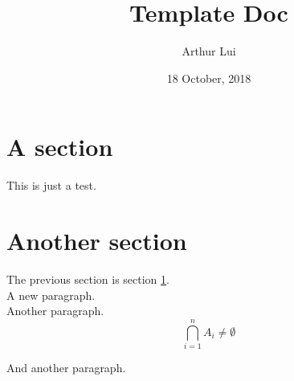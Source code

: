 \documentclass[12pt]{article} %
\title{Template Doc}
\author{Arthur Lui}
\date{18 October, 2018} %
\begin{document}
\maketitle

\tableofcontents \newpage %

\section{A section}\label{sec:a-section} %
This is just a test.

\section{Another section}\label{sec:another-section}
The previous section is section \ref{sec:a-section}. \\

A new paragraph. \\

Another paragraph. \\

$$
\bigcap_{i=1}^n A_i \ne \emptyset
$$

And another paragraph.

% 
\end{document}

